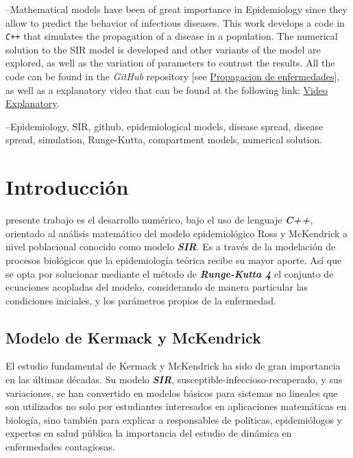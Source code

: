 \documentclass[journal]{IEEEtran}
\begin{document}
\begin{abstracteee}
	--Mathematical models have been of great importance in Epidemiology since they allow
	to predict the behavior of infectious diseases. This work develops a code in \texttt{\textit{C++}}
	that simulates the propagation of a disease in a population. The numerical solution
	to the SIR model is developed and other variants of the model are explored, as well 
	as the variation of parameters to contrast the results. All the code can be found in
	the \emph{GitHub} repository [see \href{https://github.com/niaggar/propagacion-de-enfermedades-project}{Propagacion
	de enfermedades}], as well as a explanatory video
	that can be found at the following link: \href{https://drive.google.com/file/d/1-Wrr3fB-JRRgwQq_m59-RsKbWqgoxFI4/view?usp=share_link}{Video Explanatory}.
\end{abstracteee}

\begin{IEEEkeywordsa}
	--Epidemiology, SIR, github, epidemiological models, disease spread, disease spread,
	simulation, Runge-Kutta, compartment models, numerical solution.
\end{IEEEkeywordsa}

\section{Introducción}
 presente trabajo es el desarrollo numérico, bajo el uso de
lenguaje \textbf{\textit{C++}},
orientado al análisis matemático del modelo epidemiológico Ross \cite{Ross} y
McKendrick \cite{Kermack} a nivel poblacional conocido como modelo
\textbf{\textit{SIR}}.
Es a través de la modelación de procesos biológicos que la epidemiología
teórica recibe su mayor aporte.
Así que se opta por solucionar mediante el método de
\textbf{\textit{Runge-Kutta 4}} el conjunto de ecuaciones acopladas del modelo,
considerando de manera particular las condiciones
iniciales, y los parámetros propios de la enfermedad.

\subsection{Modelo de Kermack y McKendrick}

El estudio fundamental de Kermack \cite{Ross} y McKendrick \cite{Kermack} ha
sido de gran importancia en las últimas décadas. Su modelo
\textbf{\textit{SIR}}, susceptible-infeccioso-recuperado, y sus variaciones,
se han convertido en modelos básicos para sistemas no lineales que son
utilizados no solo por estudiantes interesados en aplicaciones matemáticas en
biología,
sino también para explicar a responsables de políticas, epidemiólogos y
expertos en salud pública la importancia del estudio de dinámica en
enfermedades contagiosas.\newline
\end{document}
